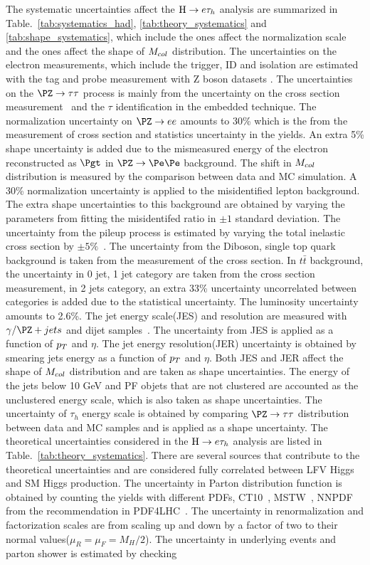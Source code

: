 The systematic uncertainties affect the $\mathrm{H} \to e \tau_{h}$ analysis are summarized in Table.~\ref{tab:systematics_had}, \ref{tab:theory_systematics} and \ref{tab:shape_systematics}, which include the ones affect the normalization scale and the ones affect the shape of $M_{col}$ distribution. The uncertainties on the electron measurements, which include the trigger, ID and isolation are estimated with the tag and probe measurement with Z boson datasets \cite{CMS:2011aa,Khachatryan:2015dfa}. The uncertainties on the $\PZ \to \tau \tau$ process is mainly from the uncertainty on the cross section measurement~\cite{Chatrchyan:2014mua} and the $\tau$ identification in the embedded technique. The normalization uncertainty on $\PZ \to ee$ amounts to 30\% which is the from the measurement of cross section and statistics uncertainty in the yields. An extra 5\% shape uncertainty is added due to the mismeasured energy of the electron reconstructed as $\Pgt$ in $\PZ \to \Pe\Pe$ background.  The shift in $M_{col}$ distribution is measured by the comparison between data and MC simulation. A 30\% normalization uncertainty is applied to the misidentified lepton background. The extra shape uncertainties to this background are obtained by varying the parameters from fitting the misidentifed ratio in $\pm1$ standard deviation.   The uncertainty from the pileup process is estimated by varying the total inelastic cross section by $\pm5\%$~\cite{Chatrchyan:2012nj}. The uncertainty from the Diboson, single top quark background is taken from the measurement of the cross section. In $t\bar{t}$ background, the uncertainty in 0 jet, 1 jet category are taken from the cross section measurement, in 2  jets category, an extra 33\% uncertainty uncorrelated between categories is added due to the statistical uncertainty. The luminosity uncertainty amounts to 2.6\%.  The jet energy scale(JES) and resolution are measured with $\gamma/\PZ+jets$ and dijet samples~\cite{CMS-JME-10-011}. The uncertainty from JES is applied as a function of $p_{T}$ and $\eta$. The jet energy resolution(JER) uncertainty is obtained by smearing jets energy as a function of $p_{T}$ and $\eta$. Both JES and JER affect the shape of $M_{col}$ distribution and are taken as shape uncertainties. The energy of the jets below 10 GeV and PF objets that are not clustered are accounted as the unclustered energy scale, which is also taken as shape uncertainties. The uncertainty of $\tau_{h}$ energy scale is obtained by comparing $\PZ \to \tau\tau$ distribution between data and MC samples and is applied as a shape uncertainty. The theoretical uncertainties considered in the $\mathrm{H} \to e \tau_{h}$ analysis are listed in Table.~\ref{tab:theory_systematics}. There are several sources that contribute to the theoretical uncertainties and are considered fully correlated between LFV Higgs and SM Higgs production. The uncertainty in Parton distribution function is obtained by counting the yields with different PDFs,  CT10~\cite{Nadolsky:2008zw}, MSTW~\cite{Martin:2009iq}, NNPDF~\cite{Ball:2010de}  from the recommendation in PDF4LHC~\cite{Botje:2011sn}. The uncertainty in renormalization and factorization scales are from scaling up and down by a factor of two to their normal values($\mu_{R}=\mu_{F}=M_{H}/2$). The uncertainty in underlying events and parton shower is estimated by checking 